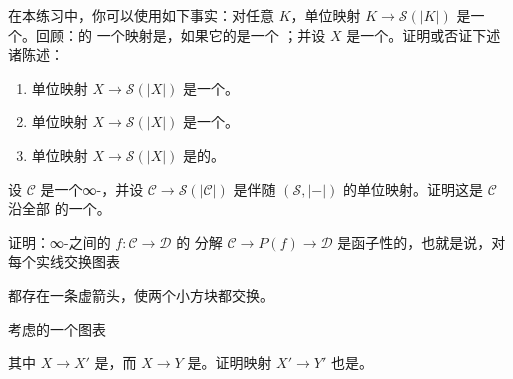 \begin{exercise}\label{ex:unit-map-singular}
在本练习中，你可以使用如下事实：对任意 \trKanComplex{} $K$，单位映射
$K \to \mathcal{S}(|K|)$ 是一个\trHomotopyEquivalence{}。回顾：\trSimplicialSet{}的
一个映射是\trWeakEquivalence{}，如果它的\trGeometricRealization{}是一个%
\trHomotopyEquivalence{}；并设 $X$ 是一个\trSimplicialSet{}。证明或否证下述诸陈述：
\begin{enumerate}[label=(\arabic*)]
  \item 单位映射 $X \to \mathcal{S}(|X|)$ 是一个\trMonomorphism{}。
  \item 单位映射 $X \to \mathcal{S}(|X|)$ 是一个\trWeakEquivalence{}。
  \item 单位映射 $X \to \mathcal{S}(|X|)$ 是\trAnodyne{}的。
\end{enumerate}
\end{exercise}

\begin{exercise}\label{ex:localize-all-morphisms}
设 $\mathcal{C}$ 是一个∞-\trCategory{}，并设 $\mathcal{C} \to \mathcal{S}(|\mathcal{C}|)$
是伴随 $(\mathcal{S}, |{-}|)$ 的单位映射。证明这是 $\mathcal{C}$ 沿全部\trMorphism{}%
的一个\trLocalization{}。
\end{exercise}

\begin{exercise}\label{ex:path-fibration-functorial}
证明：∞-\trCategories{}之间的\trFunctor{} $f\colon \mathcal{C} \to \mathcal{D}$ 的
分解 $\mathcal{C} \to P(f) \to \mathcal{D}$ 是函子性的，也就是说，对每个实线交换图表
\begin{center}
\end{center}
都存在一条虚箭头，使两个小方块都交换。
\end{exercise}

\begin{exercise}\label{ex:pushout-joyal-equivalence}
考虑\trSimplicialSet{}的一个\trPushout{}图表
\begin{center}
\end{center}
其中 $X \to X'$ 是\trMonomorphism{}，而 $X \to Y$ 是\trJoyalEquivalence{}。证明映射
$X' \to Y'$ 也是\trJoyalEquivalence{}。
\end{exercise}

